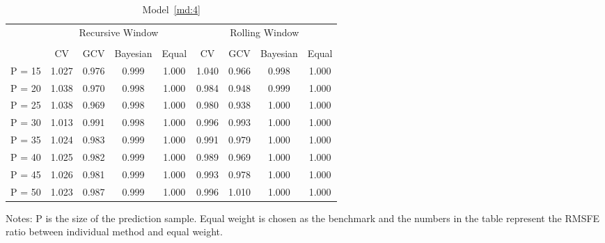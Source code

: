 \begin{table}
\caption{Model~\ref{md:4}} \label{tb:11}
\centering
\begin{adjustbox}{keepaspectratio}
\begin{threeparttable}
\begin{tabular}{lcccccccc}
\toprule
 & \multicolumn{4}{c}{Recursive Window} & \multicolumn{4}{c}{Rolling Window}\\%
\cmidrule(r){2-5}
\cmidrule(r){6-9}\\
       & CV & GCV & Bayesian & Equal & CV & GCV & Bayesian & Equal \\
P = 15 &1.027 &0.976 &0.999 & 1.000& 1.040& 0.966& 0.998& 1.000\\
P = 20 &1.038 &0.970 &0.998 & 1.000& 0.984& 0.948& 0.999& 1.000\\
P = 25 &1.038 &0.969 &0.998 & 1.000& 0.980& 0.938& 1.000& 1.000\\
P = 30 &1.013 &0.991 &0.998 & 1.000& 0.996& 0.993& 1.000& 1.000\\
P = 35 &1.024 &0.983 &0.999 & 1.000& 0.991& 0.979& 1.000& 1.000\\
P = 40 &1.025 &0.982 &0.999 & 1.000& 0.989& 0.969& 1.000& 1.000\\
P = 45 &1.026 &0.981 &0.999 & 1.000& 0.993& 0.978& 1.000& 1.000\\
P = 50 &1.023 &0.987 &0.999 & 1.000& 0.996& 1.010& 1.000& 1.000\\
\bottomrule
\end{tabular}
\begin{tablenotes} \footnotesize
Notes: $\mathrm{P}$ is the size of the prediction sample. Equal weight is chosen as the benchmark and the numbers in the table represent the RMSFE ratio between individual method and equal weight.
\end{tablenotes}
\end{threeparttable}
\end{adjustbox}
\end{table} 